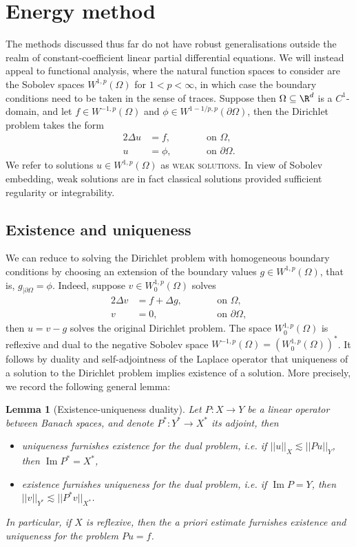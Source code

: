 \documentclass[reqno]{amsart}
\newtheorem{lemma}[theorem]{Lemma}
\theoremstyle{definition}
\theoremstyle{remark}
\newcounter{problem}[section]	\declaretheorem[style=thmrecbox,name=Problem, numberlike=problem]{statement}
\renewcommand{\emph}{\textsc}
\renewcommand{\Im}{\operatorname{Im}}
\begin{document}
\section{Energy method}

The methods discussed thus far do not have robust generalisations outside the realm of constant-coefficient linear partial differential equations. We will instead appeal to functional analysis, where the natural function spaces to consider are the Sobolev spaces $W^{1, p} (\Omega)$ for $1 < p < \infty$, in which case the boundary conditions need to be taken in the sense of traces. Suppose then $\Omega \subseteq \R^d$ is a $C^1$-domain, and let $f \in W^{-1, p} (\Omega)$ and $\phi \in W^{1-1/p, p} (\partial \Omega)$, then the Dirichlet problem takes the form
	\begin{alignat*}{2}
		\Delta u
			&= f, \qquad  && \text{on } \Omega, \\
		u
			&= \phi,	\qquad && \text{on } \partial \Omega.
	\end{alignat*} 
We refer to solutions $u \in W^{1,p} (\Omega)$ as \emph{weak solutions}. In view of Sobolev embedding, weak solutions are in fact classical solutions provided sufficient regularity or integrability. 

\subsection{Existence and uniqueness}

We can reduce to solving the Dirichlet problem with homogeneous boundary conditions by choosing an extension of the boundary values $g \in W^{1, p} (\Omega)$, that is, $g_{|\partial \Omega} = \phi$. Indeed, suppose $v \in W^{1, p}_0 (\Omega)$ solves
\begin{alignat*}{2}
		\Delta v
			&= f + \Delta g, \qquad  && \text{on } \Omega, \\
		v
			&= 0,	\qquad && \text{on } \partial \Omega,
	\end{alignat*} 
then $u = v - g$ solves the original Dirichlet problem. The space $W^{1, p}_0 (\Omega)$ is reflexive and dual to the negative Sobolev space $W^{-1, p} (\Omega) = (W^{1, p}_0 (\Omega))^*$. It follows by duality and self-adjointness of the Laplace operator that uniqueness of a solution to the Dirichlet problem implies existence of a solution. More precisely, we record the following general lemma:

\begin{lemma}[Existence-uniqueness duality]
	Let $P : X \to Y$ be a linear operator between Banach spaces, and denote $P^* : Y^* \to X^*$ its adjoint, then 
		\begin{itemize}
			\item uniqueness furnishes existence for the dual problem, i.e. if $||u||_X \lesssim ||Pu||_Y$, then $\Im P^* = X^*$,
			\item existence furnishes uniqueness for the dual problem, i.e. if $\Im P = Y$, then $||v||_{Y^*} \lesssim ||P^* v||_{X^*}$. 
		\end{itemize}
	In particular, if $X$ is reflexive, then the a priori estimate furnishes existence and uniqueness for the problem $Pu = f$. 	
\end{lemma}
\end{document}
